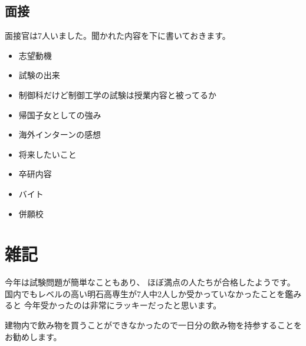 \documentclass[]{jsarticle}
\begin{document}
    \subsection*{面接}
        面接官は7人いました。聞かれた内容を下に書いておきます。
        \begin{itemize}
            \item 志望動機
            \item 試験の出来
            \item 制御科だけど制御工学の試験は授業内容と被ってるか
            \item 帰国子女としての強み
            \item 海外インターンの感想
            \item 将来したいこと
            \item 卒研内容
            \item バイト
            \item 併願校
        \end{itemize}
\section*{雑記}
    今年は試験問題が簡単なこともあり、
    ほぼ満点の人たちが合格したようです。
    国内でもレベルの高い明石高専生が7人中2人しか受かっていなかったことを鑑みると
    今年受かったのは非常にラッキーだったと思います。

    建物内で飲み物を買うことができなかったので一日分の飲み物を持参することをお勧めします。
\end{document}
